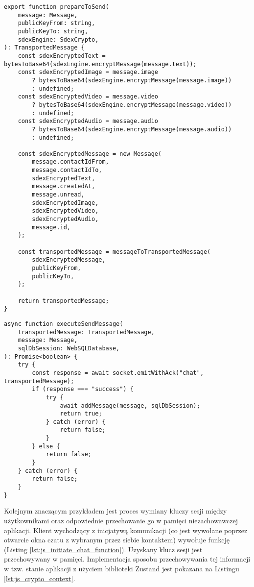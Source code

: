 \documentclass[../main.tex]{subfiles}
\begin{document}
\begin{lstlisting}[caption={Przygotowywanie wiadomości do wysyłki},label={lst:js_prepare_to_send_message_function}]
export function prepareToSend(
    message: Message,
    publicKeyFrom: string,
    publicKeyTo: string,
    sdexEngine: SdexCrypto,
): TransportedMessage {
    const sdexEncryptedText = bytesToBase64(sdexEngine.encryptMessage(message.text));
    const sdexEncryptedImage = message.image
        ? bytesToBase64(sdexEngine.encryptMessage(message.image))
        : undefined;
    const sdexEncryptedVideo = message.video
        ? bytesToBase64(sdexEngine.encryptMessage(message.video))
        : undefined;
    const sdexEncryptedAudio = message.audio
        ? bytesToBase64(sdexEngine.encryptMessage(message.audio))
        : undefined;

    const sdexEncryptedMessage = new Message(
        message.contactIdFrom,
        message.contactIdTo,
        sdexEncryptedText,
        message.createdAt,
        message.unread,
        sdexEncryptedImage,
        sdexEncryptedVideo,
        sdexEncryptedAudio,
        message.id,
    );

    const transportedMessage = messageToTransportedMessage(
        sdexEncryptedMessage,
        publicKeyFrom,
        publicKeyTo,
    );

    return transportedMessage;
}
\end{lstlisting}

\begin{lstlisting}[caption={Wysyłanie wiadomości - funkcja odpowiedzialna za komunikację z serwerem i dodanie wiadomości do bazy danych},label={lst:js_execute_send_message_function}]
async function executeSendMessage(
    transportedMessage: TransportedMessage,
    message: Message,
    sqlDbSession: WebSQLDatabase,
): Promise<boolean> {
    try {
        const response = await socket.emitWithAck("chat", transportedMessage);
        if (response === "success") {
            try {
                await addMessage(message, sqlDbSession);
                return true;
            } catch (error) {
                return false;
            }
        } else {
            return false;
        }
    } catch (error) {
        return false;
    }
}
\end{lstlisting}

Kolejnym znaczącym przykładem jest proces wymiany kluczy sesji między użytkownikami oraz odpowiednie przechowanie go w pamięci niezachowawczej aplikacji. Klient wychodzący z inicjatywą komunikacji (co jest wywołane poprzez otwarcie okna czatu z wybranym przez siebie kontaktem) wywołuje funkcję  (Listing \ref{lst:js_initiate_chat_function}). Uzyskany klucz sesji jest przechowywany w pamięci. Implementacja sposobu przechowywania tej informacji w tzw. stanie aplikacji z użyciem biblioteki Zustand jest pokazana na Listingu \ref{lst:js_crypto_context}.
\end{document}
